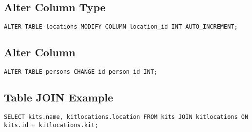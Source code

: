 \documentclass{article}
\begin{document}
\begin{multicols}{3}
\subsection{Alter Column Type}
\lstinline|ALTER TABLE locations MODIFY COLUMN location_id INT AUTO_INCREMENT;|

\subsection{Alter Column}
\lstinline|ALTER TABLE persons CHANGE id person_id INT;|

\subsection{Table JOIN Example}
\lstinline|SELECT kits.name, kitlocations.location FROM kits JOIN kitlocations ON kits.id = kitlocations.kit;|

\end{multicols}
\end{document}
